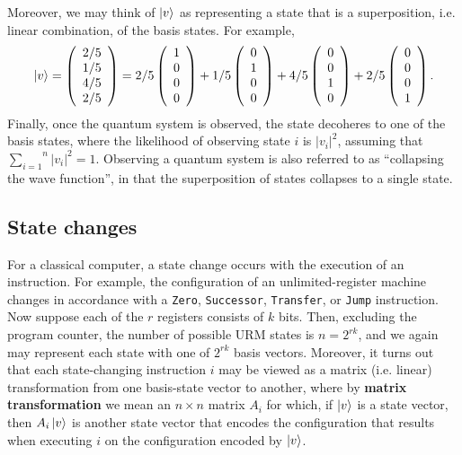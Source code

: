 \documentclass [12pt]{article}
\theoremstyle{definition}
\begin{document}
Moreover, 
we may think of $\ket{v}$ as representing a state that is a superposition, i.e. linear combination, of the basis states. For example, 
\[\ket{v} = 
\left(\begin{array}{c}
2/5\\
1/5 \\
4/5\\
2/5\\
\end{array}\right) =
2/5\left(\begin{array}{c}
1\\
0 \\
0\\
0\\
\end{array}\right)+
1/5\left(\begin{array}{c}
0\\
1 \\
0\\
0\\
\end{array}\right)+
4/5\left(\begin{array}{c}
0\\
0 \\
1\\
0\\
\end{array}\right)+
2/5\left(\begin{array}{c}
0\\
0 \\
0\\
1\\
\end{array}\right).\]
Finally, once the quantum system is observed, the state decoheres to one of the basis states, where the likelihood of observing state $i$ is $|v_i|^2$,
assuming that $\overset{n}{\underset{i=1}{\sum}}|v_i|^2=1$.
Observing a quantum system is also referred to as ``collapsing the wave function'', in that the superposition of states collapses to a single state.

\subsection*{State changes}

For a classical computer, a state change occurs with the execution of an instruction. For example, the configuration of an unlimited-register machine changes in accordance
with a \texttt{Zero}, \texttt{Successor}, \texttt{Transfer}, or \texttt{Jump} instruction. Now suppose each of the $r$ registers consists of $k$ bits. Then, excluding 
the program counter, the number of possible URM states is $n=2^{rk}$, and we again may represent each state with one of $2^{rk}$ basis vectors. Moreover, it turns out that
each state-changing instruction $i$ may be viewed as a matrix (i.e. linear) transformation from one basis-state vector to another, where by \textbf{matrix transformation} we mean an $n\times n$
matrix $A_i$ for which, if $\ket{v}$ is a state vector, then $A_i\ket{v}$ is another state vector that encodes the configuration that results when executing $i$ on the configuration 
encoded by $\ket{v}$.
\end{document}
